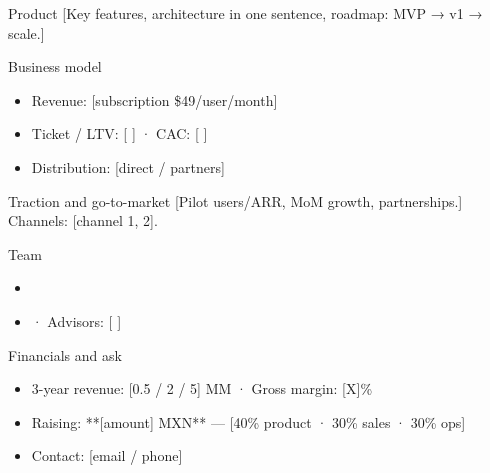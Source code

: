 \documentclass[aspectratio=169,12pt]{beamer}
\begin{document}
\begin{frame}{Product}
  [Key features, architecture in one sentence, roadmap: MVP → v1 → scale.]
\end{frame}

\begin{frame}{Business model}
  \begin{itemize}
    \item Revenue: [subscription \$49/user/month]
    \item Ticket / LTV: [ ] · CAC: [ ]
    \item Distribution: [direct / partners]
  \end{itemize}
\end{frame}

\begin{frame}{Traction and go-to-market}
  [Pilot users/ARR, MoM growth, partnerships.] Channels: [channel 1, 2].
\end{frame}

\begin{frame}{Team}
  \begin{itemize}
    \item [Name — role, ex-(company), N years]
    \item [Name — role, credential] · Advisors: [ ]
  \end{itemize}
\end{frame}

\begin{frame}{Financials and ask}
  \begin{itemize}
    \item 3-year revenue: [0.5 / 2 / 5] MM · Gross margin: [X]\%
    \item Raising: **[amount] MXN** — [40\% product · 30\% sales · 30\% ops]
    \item Contact: [email / phone]
  \end{itemize}
\end{frame}
\end{document}
